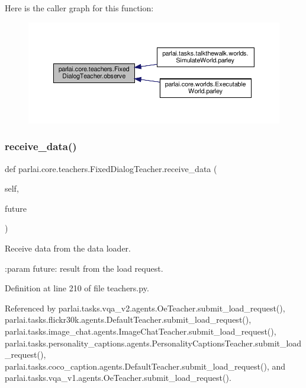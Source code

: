 Here is the caller graph for this function\+:
\nopagebreak
\begin{figure}[H]
\begin{center}
\leavevmode
\includegraphics[width=350pt]{classparlai_1_1core_1_1teachers_1_1FixedDialogTeacher_a32febe29909f7523b0d7b5ee7335fd05_icgraph}
\end{center}
\end{figure}
\mbox{\label{classparlai_1_1core_1_1teachers_1_1FixedDialogTeacher_a001ed7924490d0e291588c54d383384a}} 
\subsubsection{\texorpdfstring{receive\+\_\+data()}{receive\_data()}}
{\footnotesize\ttfamily def parlai.\+core.\+teachers.\+Fixed\+Dialog\+Teacher.\+receive\+\_\+data (\begin{DoxyParamCaption}\item[{}]{self,  }\item[{}]{future }\end{DoxyParamCaption})}

\begin{DoxyVerb}Receive data from the data loader.

:param future: result from the load request.
\end{DoxyVerb}
 

Definition at line 210 of file teachers.\+py.



Referenced by parlai.\+tasks.\+vqa\+\_\+v2.\+agents.\+Oe\+Teacher.\+submit\+\_\+load\+\_\+request(), parlai.\+tasks.\+flickr30k.\+agents.\+Default\+Teacher.\+submit\+\_\+load\+\_\+request(), parlai.\+tasks.\+image\+\_\+chat.\+agents.\+Image\+Chat\+Teacher.\+submit\+\_\+load\+\_\+request(), parlai.\+tasks.\+personality\+\_\+captions.\+agents.\+Personality\+Captions\+Teacher.\+submit\+\_\+load\+\_\+request(), parlai.\+tasks.\+coco\+\_\+caption.\+agents.\+Default\+Teacher.\+submit\+\_\+load\+\_\+request(), and parlai.\+tasks.\+vqa\+\_\+v1.\+agents.\+Oe\+Teacher.\+submit\+\_\+load\+\_\+request().

